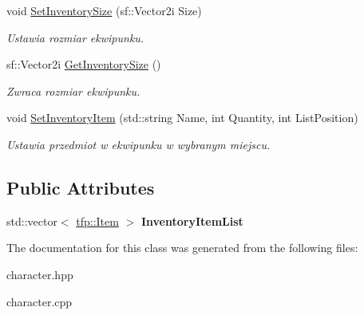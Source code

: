 \begin{DoxyCompactItemize}
\mbox{\label{classtfp_1_1_player_adac483d955774193b8c786e88c3a069a}} 
void \mbox{\hyperlink{classtfp_1_1_player_adac483d955774193b8c786e88c3a069a}{Set\+Inventory\+Size}} (sf\+::\+Vector2i Size)
\begin{DoxyCompactList}\small\item\em Ustawia rozmiar ekwipunku. \end{DoxyCompactList}\item 
\mbox{\label{classtfp_1_1_player_a348f5b369f74c2268982709e3162cd5f}} 
sf\+::\+Vector2i \mbox{\hyperlink{classtfp_1_1_player_a348f5b369f74c2268982709e3162cd5f}{Get\+Inventory\+Size}} ()
\begin{DoxyCompactList}\small\item\em Zwraca rozmiar ekwipunku. \end{DoxyCompactList}\item 
\mbox{\label{classtfp_1_1_player_ababfde32d562d636214faa86a5006c8b}} 
void \mbox{\hyperlink{classtfp_1_1_player_ababfde32d562d636214faa86a5006c8b}{Set\+Inventory\+Item}} (std\+::string Name, int Quantity, int List\+Position)
\begin{DoxyCompactList}\small\item\em Ustawia przedmiot w ekwipunku w wybranym miejscu. \end{DoxyCompactList}\end{DoxyCompactItemize}
\subsection*{Public Attributes}
\begin{DoxyCompactItemize}
\item 
\mbox{\label{classtfp_1_1_player_a3c6707ea108f52cbbff9d396c93d6fdb}} 
std\+::vector$<$ \mbox{\hyperlink{structtfp_1_1_item}{tfp\+::\+Item}} $>$ {\bfseries Inventory\+Item\+List}
\end{DoxyCompactItemize}


The documentation for this class was generated from the following files\+:\begin{DoxyCompactItemize}
\item 
character.\+hpp\item 
character.\+cpp\end{DoxyCompactItemize}
